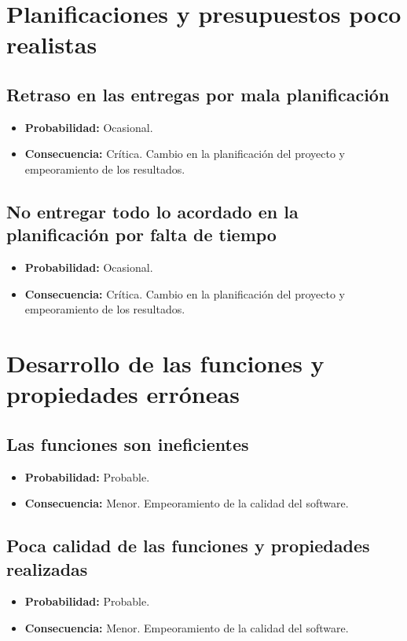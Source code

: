 \documentclass[spanish,a4paper,12pt]{report}	%
\begin{document}
%
\section{Planificaciones y presupuestos poco realistas}

	\subsection*{Retraso en las entregas por mala planificación}
		\begin{itemize}
			\item \textbf {Probabilidad: }Ocasional.
			\item \textbf {Consecuencia: }Crítica. Cambio en la planificación del proyecto y empeoramiento de los resultados.
		\end{itemize}
	
	\subsection*{No entregar todo lo acordado en la planificación por falta de tiempo}
		\begin{itemize}
			\item \textbf {Probabilidad: }Ocasional.
			\item \textbf {Consecuencia: }Crítica. Cambio en la planificación del proyecto y empeoramiento de los resultados.
		\end{itemize}

%
\section{Desarrollo de las funciones y propiedades erróneas}

	\subsection*{Las funciones son ineficientes}
		\begin{itemize}
			\item \textbf {Probabilidad: }Probable.
			\item \textbf {Consecuencia: }Menor. Empeoramiento de la calidad del software.
		\end{itemize}
	
	\subsection*{Poca calidad de las funciones y propiedades realizadas}
		\begin{itemize}
			\item \textbf {Probabilidad: }Probable.
			\item \textbf {Consecuencia: }Menor. Empeoramiento de la calidad del software.
		\end{itemize}
	
\end{document}
